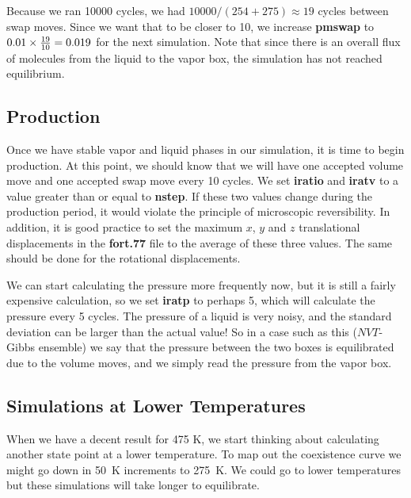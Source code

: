 \documentclass[12pt,letterpaper]{article}
\begin{document}
{{{{{{{\noindent Because we ran 10000 cycles, we had $10000 / (254 + 275)
\approx 19 $ cycles between swap moves.  Since we want that to be
closer to 10, we increase {\bf pmswap} to $0.01 \times {19 \over
10} = 0.019$ for the next simulation.  Note that since there is an
overall flux of molecules from the liquid to the vapor box, the
simulation has not reached equilibrium.

\subsection{Production}
\noindent Once we have stable vapor and liquid phases in our simulation,
it is time to begin production.  At this point, we
should know that we will have one accepted volume move and one accepted
swap move every 10 cycles.  We set {\bf iratio} and {\bf iratv} to a value greater than or equal to {\bf
nstep}.  If these two values change during the production period, it would
violate the principle of microscopic reversibility.  
In addition, it is good practice to set the maximum $x$, $y$ and $z$ translational
displacements in the {\bf fort.77} file to the average of these three values.  The same should
be done for the rotational displacements.

\noindent We can start calculating the pressure more frequently now,
but it is still a fairly expensive calculation, so we set {\bf iratp} to
perhaps 5, which will calculate the pressure every 5 cycles.  
The pressure of a liquid is very noisy, and the standard
deviation can be larger than the actual value!  
So in a case such as this ($NVT$-Gibbs ensemble) we say that the pressure between the two boxes
is equilibrated due to the volume moves, and we simply read the pressure from the vapor box.

\subsection{Simulations at Lower Temperatures}
\noindent When we have a decent result for 475 K, we start thinking about
calculating another state point at a lower temperature.  To map out
the coexistence curve we might go down in 50~K increments to 275~K.
We could go to lower temperatures but these simulations will take longer to equilibrate.  

}}}}}}}
\end{document}
